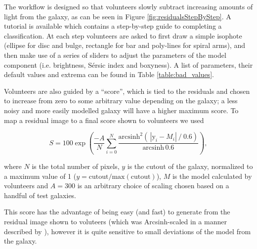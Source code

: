 \documentclass[../main.tex]{subfiles}
\begin{document}
The workflow is designed so that volunteers slowly subtract increasing amounts of light from the galaxy, as can be seen in Figure \ref{fig:residualsStepByStep}. A tutorial is available which contains a step-by-step guide to completing a classification. At each step volunteers are asked to first draw a simple isophote (ellipse for disc and bulge, rectangle for bar and poly-lines for spiral arms), and then make use of a series of sliders to adjust the parameters of the model component (i.e. brightness, S\'ersic index and boxyness). A list of parameters, their default values and extrema can be found in Table \ref{table:bad_values}.

Volunteers are also guided by a ``score'', which is tied to the residuals and chosen to increase from zero to some arbitrary value depending on the galaxy; a less noisy and more easily modelled galaxy will have a higher maximum score. To map a residual image to a final score shown to volunteers we used

\begin{equation}
  \label{eq:gal_score}
    S = 100 \exp\left(\frac{-A}{N}\sum_{i=0}^N\frac{\text{arcsinh}^2\left(\,|\text{y}_i - M_i|\ /\ 0.6\right)}{\text{arcsinh}\,0.6 }\right),
\end{equation}

where $N$ is the total number of pixels, $y$ is the cutout of the galaxy, normalized to a maximum value of 1 ($y = \text{cutout}/\text{max}(\text{cutout})$), $M$ is the model calculated by volunteers and $A=300$ is an arbitrary choice of scaling chosen based on a handful of test galaxies.

This score has the advantage of being easy (and fast) to generate from the residual image shown to voluteers (which was Arcsinh-scaled in a manner described by \citealt{Lupton2003:astro-ph/0312483v1}), however it is quite sensitive to small deviations of the model from the galaxy.
\end{document}
